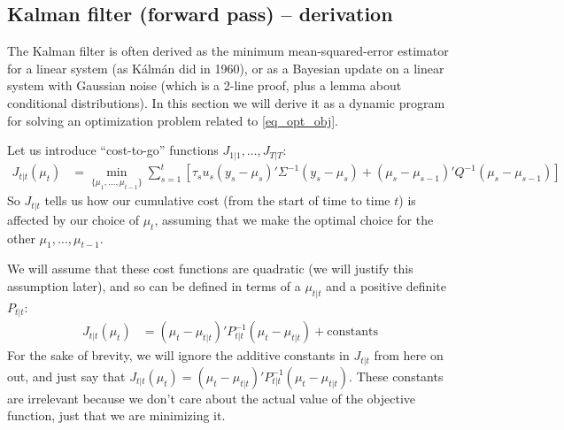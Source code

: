 \documentclass[11pt]{article}
\begin{document}
\subsection{Kalman filter (forward pass) -- derivation}

The Kalman filter is often derived as the minimum mean-squared-error estimator for a linear system (as K\'{a}lm\'{a}n did in 1960), or as a Bayesian update on a linear system with Gaussian noise (which is a 2-line proof, plus a lemma about conditional distributions). In this section we will derive it as a dynamic program for solving an optimization problem related to \eqref{eq_opt_obj}.

Let us introduce ``cost-to-go'' functions $J_{1|1}, \dotsc, J_{T|T}$:
\begin{align}
	J_{t|t}( \mu_t ) 
	&= \min_{\{\mu_1, \dotsc, \mu_{t-1}\}} \sum_{s=1}^t \left[ 
	\tau_s u_s (y_s - \mu_s)' \Sigma^{-1} (y_s - \mu_s) + (\mu_s - \mu_{s-1})' Q^{-1} (\mu_s - \mu_{s-1})
	\right]
	\label{eq_Jtt_def}
\end{align}
So $J_{t|t}$ tells us how our cumulative cost (from the start of time to time $t$) is affected by our choice of $\mu_t$, assuming that we make the optimal choice for the other $\mu_1, \dotsc, \mu_{t-1}$.

We will assume that these cost functions are quadratic (we will justify this assumption later), and so can be defined in terms of a $\mu_{t|t}$ and a positive definite $P_{t|t}$:
\begin{align}
	J_{t|t}( \mu_t ) 
	&= (\mu_t - \mu_{t|t})' P_{t|t}^{-1} (\mu_t - \mu_{t|t}) + \mathrm{constants}
	\label{eq_Jtt_form}
\end{align}
For the sake of brevity, we will ignore the additive constants in $J_{t|t}$ from here on out, and just say that $J_{t|t}(\mu_t) = (\mu_t - \mu_{t|t})'P_{t|t}^{-1}(\mu_t - \mu_{t|t})$. These constants are irrelevant because we don't care about the actual value of the objective function, just that we are minimizing it.
\end{document}
